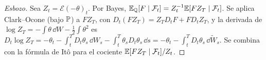 \begin{proof}[Esbozo]
Sea $Z_t=\mathcal E(-\theta)_t$. Por Bayes, $\E_\Q[F\mid\F_t]=Z_t^{-1}\E[FZ_T\mid\F_t]$. Se aplica Clark--Ocone
(bajo $\P$) a $FZ_T$, con $D_t(FZ_T)=Z_TD_tF+FD_tZ_T$, y la derivada de $\log Z_T=-\int\theta\,\dd W-\frac12\int\theta^2$
es $D_t\log Z_T=-\theta_t-\int_t^TD_t\theta_s\,\dd W_s-\int_t^T\theta_sD_t\theta_s\,\dd s=-\theta_t-\int_t^TD_t\theta_s\,\dd\tilde W_s$. Se combina con la
fórmula de Itô para el cociente $\E[FZ_T\mid\F_t]/Z_t$.
\end{proof}
